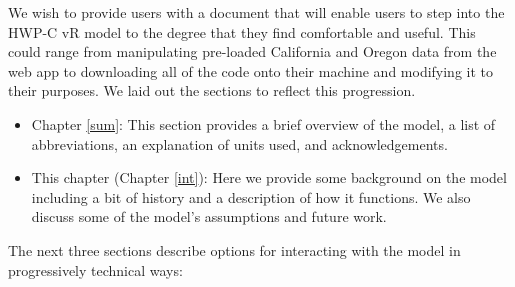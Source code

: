\documentclass[
  openany]{book}
\providecommand{\tightlist}{%
  \setlength{\itemsep}{0pt}\setlength{\parskip}{0pt}}
\begin{document}
We wish to provide users with a document that will enable users to step into the HWP-C vR model to the degree that they find comfortable and useful. This could range from manipulating pre-loaded California and Oregon data from the web app to downloading all of the code onto their machine and modifying it to their purposes. We laid out the sections to reflect this progression.

\begin{itemize}
\tightlist
\item
  Chapter \ref{sum}: This section provides a brief overview of the model, a list of abbreviations, an explanation of units used, and acknowledgements.\\
\item
  This chapter (Chapter \ref{int}): Here we provide some background on the model including a bit of history and a description of how it functions. We also discuss some of the model's assumptions and future work.
\end{itemize}

The next three sections describe options for interacting with the model in progressively technical ways:
\end{document}
